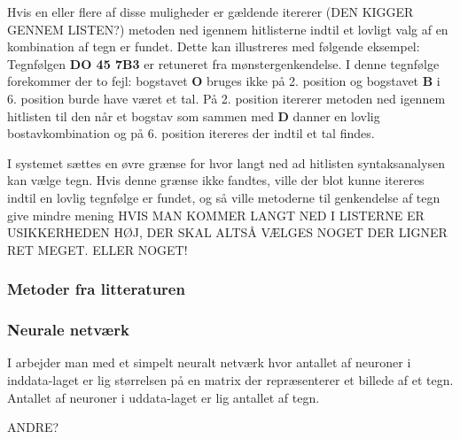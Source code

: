 Hvis en eller flere af disse muligheder er gældende itererer (DEN KIGGER GENNEM LISTEN?) metoden ned igennem hitlisterne indtil et lovligt valg af en kombination af tegn er fundet. Dette kan illustreres med følgende eksempel: Tegnfølgen \textbf{DO 45 7B3} er retuneret fra mønstergenkendelse. I denne tegnfølge forekommer der to fejl: bogstavet \textbf{O} bruges ikke på 2. position og bogstavet \textbf{B} i 6. position burde have været et tal. På 2. position itererer metoden ned igennem hitlisten til den når et bogstav som sammen med \textbf{D} danner en lovlig bostavkombination og på 6. position itereres der indtil et tal findes.

I systemet sættes en øvre grænse for hvor langt ned ad hitlisten syntaksanalysen kan vælge tegn. Hvis denne grænse ikke fandtes, ville der blot kunne itereres indtil en lovlig tegnfølge er fundet, og så ville metoderne til genkendelse af tegn give mindre mening HVIS MAN KOMMER LANGT NED I LISTERNE ER USIKKERHEDEN HØJ, DER SKAL ALTSÅ VÆLGES NOGET DER LIGNER RET MEGET. ELLER NOGET!

\subsubsection{Metoder fra litteraturen}

\subsubsection*{Neurale netværk}
I \cite{kwas} arbejder man med et simpelt neuralt netværk hvor antallet af neuroner i inddata-laget er lig størrelsen på en matrix der repræsenterer et billede af et tegn. Antallet af neuroner i uddata-laget er lig antallet af tegn.

ANDRE?
